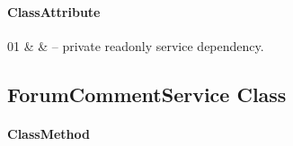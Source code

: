 \paragraph{ClassAttribute}
\begin{ClassAttributeTable}
01 &  &  -- private readonly service dependency. \\ \hline
\end{ClassAttributeTable}

\subsection{ForumCommentService Class}

\paragraph{ClassMethod}
